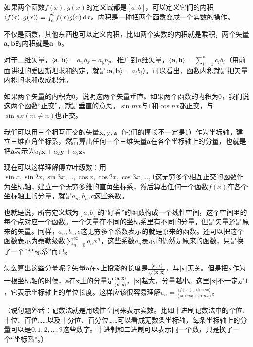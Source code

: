 如果两个函数$f(x),g(x)$的定义域都是$[a,b]$，可以定义它们的内积$\langle f(x),g(x) \rangle=\int_a^b f(x) g(x) \mathop{}\!\mathrm{d} x$。内积是一种把两个函数变成一个实数的操作。

不仅是函数，其他东西也可以定义内积，比如两个实数的内积就是乘积，两个矢量$\mathbf{a},\mathbf{b}$的内积就是$\mathbf{a} \cdot \mathbf{b}$。

对于二维矢量，$\langle \mathbf{a},\mathbf{b} \rangle=a_x b_x+a_y b_y$。推广到$n$维矢量，$\langle \mathbf{a},\mathbf{b} \rangle=\sum_{i=1}^n a_i b_i$（用前面讲过的爱因斯坦求和约定，就是$\langle \mathbf{a},\mathbf{b} \rangle=a_i b_i$）。可以看出，函数内积就是把矢量内积的求和改成积分。

如果两个矢量的内积为$0$，说明这两个矢量垂直。如果两个函数的内积为$0$，我们说这两个函数“正交”，就是垂直的意思。$\sin m x$与$1$和$\cos n x$都正交，与$\sin n x(m \neq n)$也正交。

我们可以用三个相互正交的矢量$\mathbf{x},\mathbf{y},\mathbf{z}$（它们的模长不一定是$1$）作为坐标轴，建立三维直角坐标系，然后算出任何一个三维矢量$\mathbf{a}$在各个坐标轴上的分量，也就是把$\mathbf{a}$表示为$a_1 \mathbf{x}+a_2 \mathbf{y}+a_3 \mathbf{z}$。

现在可以这样理解傅立叶级数：用$\sin x,\sin 2 x,\sin 3 x,\dots,\cos x,\cos 2 x,\cos 3 x,\dots,1$这无穷多个相互正交的函数作为坐标轴，建立一个无穷多维的直角坐标系，然后算出任何一个函数$f(x)$在各个坐标轴上的分量，就是$a_n,b_n,c$这些系数。

也就是说，所有定义域为$[a,b]$的“好看”的函数构成一个线性空间，这个空间里的每个点对应一个函数。一个矢量在不同的坐标系里有不同的分量，但是矢量还是原来的矢量。同样，$a_n,b_n,c$这无穷多个系数表示的就是原来的函数。还可以把这个函数表示为泰勒级数$\sum_{n=0}^{\infty} a_n x^n$，这些系数$a_n$表示的仍然是原来的函数，只是换了一个“坐标系”而已。

怎么算出这些分量呢？矢量$\mathbf{a}$在$\mathbf{x}$上投影的长度是$\frac{\langle \mathbf{a},\mathbf{x} \rangle}{\sqrt{\langle \mathbf{x},\mathbf{x} \rangle}}$，与$|\mathbf{x}|$无关。但是把$\mathbf{x}$作为一根坐标轴的时候，$\mathbf{a}$在$\mathbf{x}$上的分量是$\frac{\langle \mathbf{a},\mathbf{x} \rangle}{\langle \mathbf{x},\mathbf{x} \rangle}$，$|\mathbf{x}|$越大，分量越小。这里$|\mathbf{x}|$不一定是$1$，它表示坐标轴上的单位长度。这样应该很容易理解$a_n=\frac{\langle f(x),\sin n x \rangle}{\langle \sin n x,\sin n x \rangle}$。

（说句题外话：记数法就是用线性空间来表示实数。比如十进制记数法中的个位、十位、百位……以及十分位、百分位……可以看成无数条坐标轴，每条坐标轴上的分量可以是$0,1,2,\dots,9$这些数字。十进制和二进制可以表示同一个数，只是换了一个“坐标系”。）
